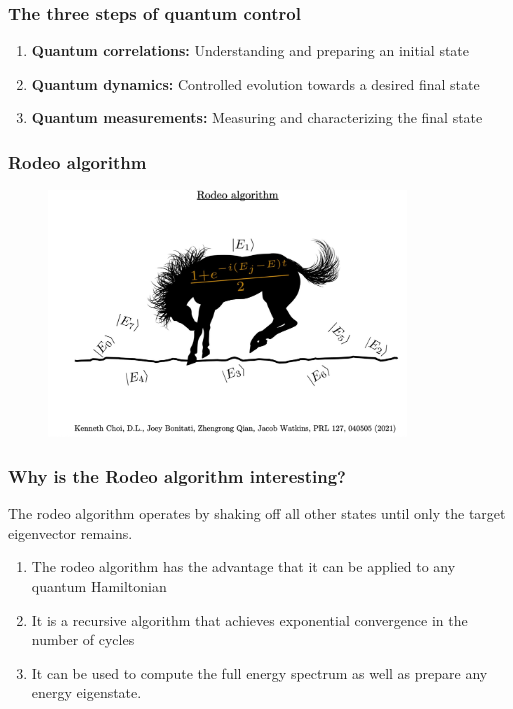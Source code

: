 \documentclass{beamer}
\begin{document}
\begin{frame}
\frametitle{The three steps of quantum control}
\begin{enumerate}
\item {\bf Quantum correlations:} Understanding and preparing an initial state
\item {\bf Quantum dynamics:} Controlled evolution towards a desired final state
\item {\bf Quantum measurements:} Measuring and characterizing the final state
\end{enumerate}
\end{frame}

\begin{frame}
\frametitle{Rodeo algorithm}

\begin{figure}
\centering
\includegraphics[width=9.5cm]{rodeofigs/rodeo1.png}
\end{figure} 

\end{frame}


\begin{frame}
\frametitle{Why is the Rodeo algorithm interesting?}
The rodeo algorithm operates by shaking off all other states until only the target eigenvector remains.
\begin{enumerate}
\item The rodeo algorithm has the advantage that it can be applied to any quantum Hamiltonian
\item It is a recursive algorithm that achieves exponential convergence in the number of cycles
\item It can be used to compute the full energy spectrum as well as prepare any energy eigenstate.
\end{enumerate}
\end{frame}
\end{document}

